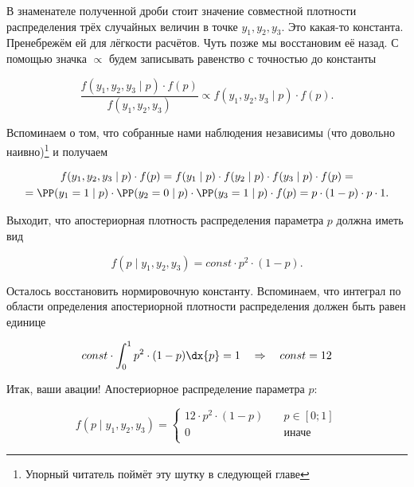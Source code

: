 В знаменателе полученной дроби стоит значение совместной плотности распределения трёх случайных величин в точке $y_1, y_2, y_3$. Это какая-то константа. Пренебрежём ей для лёгкости расчётов. Чуть позже мы восстановим её назад. С помощью значка $\propto$ будем записывать равенство с точностью до константы

\[  \frac{f(y_1,y_2,y_3 \mid p) \cdot f(p)}{f(y_1,y_2,y_3)} \propto f(y_1,y_2,y_3 \mid p) \cdot f(p).\]

Вспоминаем о том, что собранные нами наблюдения независимы (что довольно наивно)\footnote{Упорный читатель поймёт эту шутку в следующей главе} и получаем

\begin{multline*}
f(y_1,y_2,y_3 \mid p) \cdot f(p) =  f(y_1 \mid p) \cdot f(y_2 \mid p) \cdot f(y_3 \mid p) \cdot f(p) = \\ = \PP(y_1 = 1 \mid p) \cdot \PP(y_2 = 0 \mid p) \cdot \PP(y_3 = 1 \mid p) \cdot f(p) = p \cdot (1 - p) \cdot p \cdot 1.
\end{multline*}

Выходит, что апостериорная плотность распределения параметра $p$ должна иметь вид

\[ f(p \mid y_1, y_2, y_3) = const \cdot p^2 \cdot (1-p).\]

Осталось восстановить нормировочную константу. Вспоминаем, что интеграл по области определения апостериорной плотности распределения должен быть равен единице


\[ const \cdot \int_0^1 p^2 \cdot (1-p) \dx{p}  = 1 \quad \Rightarrow \quad const = 12 \]

Итак, ваши авации! Апостериорное распределение параметра $p$:


\[ f(p \mid y_1, y_2, y_3) =
  \begin{cases}
    12 \cdot p^2 \cdot (1-p)   & \quad p \in [0;1] \\
    0      & \quad \text{иначе}\\
  \end{cases}
\]


